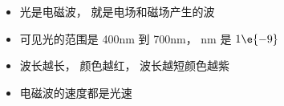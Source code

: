 
\begin{issues}
\issueDraft
\end{issues}

\begin{itemize}
\item 光是电磁波， 就是电场和磁场产生的波
\item 可见光的范围是 400nm 到 700nm， nm 是 $1\e{-9}$
\item 波长越长， 颜色越红， 波长越短颜色越紫
\item 电磁波的速度都是光速
\end{itemize}
